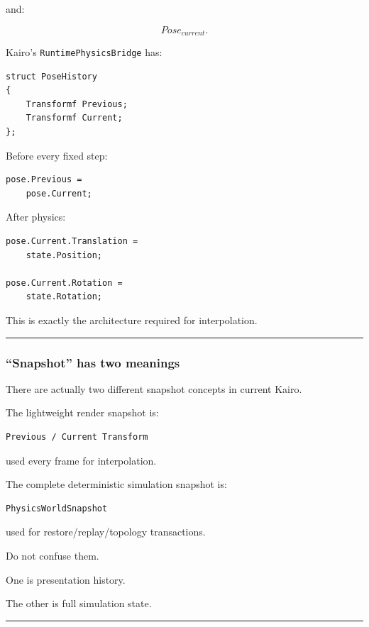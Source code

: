 and:

\[
Pose_{current}.
\]

Kairo's \texttt{RuntimePhysicsBridge} has:

\begin{verbatim}
struct PoseHistory
{
    Transformf Previous;
    Transformf Current;
};
\end{verbatim}

Before every fixed step:

\begin{verbatim}
pose.Previous =
    pose.Current;
\end{verbatim}

After physics:

\begin{verbatim}
pose.Current.Translation =
    state.Position;

pose.Current.Rotation =
    state.Rotation;
\end{verbatim}

This is exactly the architecture required for interpolation.

\begin{center}\rule{0.5\linewidth}{0.5pt}\end{center}

\subsubsection{``Snapshot'' has two meanings}\label{snapshot-has-two-meanings}

There are actually two different snapshot concepts in current Kairo.

The lightweight render snapshot is:

\begin{verbatim}
Previous / Current Transform
\end{verbatim}

used every frame for interpolation.

The complete deterministic simulation snapshot is:

\begin{verbatim}
PhysicsWorldSnapshot
\end{verbatim}

used for restore/replay/topology transactions.

Do not confuse them.

One is presentation history.

The other is full simulation state.

\begin{center}\rule{0.5\linewidth}{0.5pt}\end{center}

